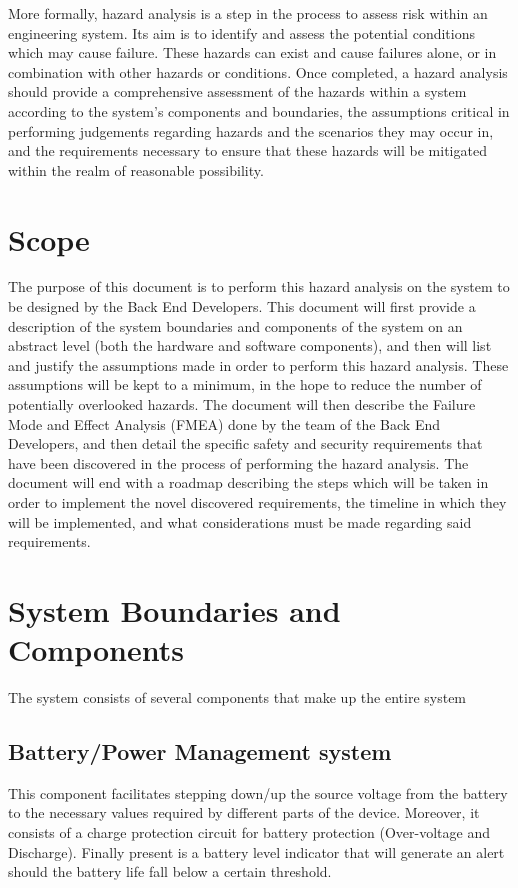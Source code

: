 \documentclass{article}
\begin{document}
More formally, hazard analysis is a step in the process to assess risk within an engineering system. Its aim is to identify and assess the potential conditions which may cause failure. These hazards can exist and cause failures alone, or in combination with other hazards or conditions. Once completed, a hazard analysis should provide a comprehensive assessment of the hazards within a system according to the system's components and boundaries, the assumptions critical in performing judgements regarding hazards and the scenarios they may occur in, and the requirements necessary to ensure that these hazards will be mitigated within the realm of reasonable possibility.

\section{Scope}

The purpose of this document is to perform this hazard analysis on the system to be designed by the Back End Developers. This document will first provide a description of the system boundaries and components of the system on an abstract level (both the hardware and software components), and then will list and justify the assumptions made in order to perform this hazard analysis. These assumptions will be kept to a minimum, in the hope to reduce the number of potentially overlooked hazards. The document will then describe the Failure Mode and Effect Analysis (FMEA) done by the team of the Back End Developers, and then detail the specific safety and security requirements that have been discovered in the process of performing the hazard analysis. The document will end with a roadmap describing the steps which will be taken in order to implement the novel discovered requirements, the timeline in which they will be implemented, and what considerations must be made regarding said requirements.

\section{System Boundaries and Components}
The system consists of several components that make up the entire system

\subsection{Battery/Power Management system}
This component facilitates stepping down/up the source voltage from the battery to the necessary values required by different parts of the device. Moreover, it consists of a 										charge protection circuit for battery protection (Over-voltage and Discharge). Finally present is a battery level indicator that will generate an alert should the battery life fall below a certain threshold.
\end{document}
